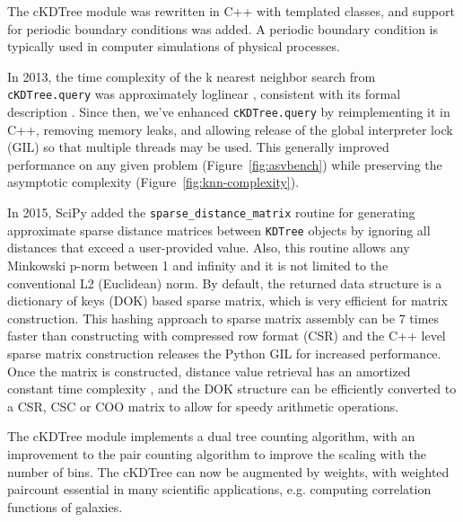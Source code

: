 The cKDTree module was rewritten in C++ with templated classes, and support for
periodic boundary conditions was added. A periodic boundary condition is typically 
used in computer simulations of physical processes.

In 2013, the time complexity of the k nearest neighbor search from
\texttt{cKDTree.query} was approximately loglinear \cite{knn-jake},
consistent with its formal description \cite{kdtree-search-algo}.
Since then, we've enhanced \texttt{cKDTree.query} by reimplementing it in
C++, removing memory leaks, and allowing release of the global interpreter lock (GIL) so that
multiple threads may be used\cite{gh-4374}. This generally improved
performance on any given problem (Figure~\ref{fig:asvbench}) while
preserving the asymptotic complexity (Figure~\ref{fig:knn-complexity}).

In 2015, SciPy added the \texttt{sparse\_distance\_matrix} routine for generating approximate 
sparse distance matrices between \texttt{KDTree} objects by ignoring all distances that 
exceed a user-provided value. Also, this routine allows any Minkowski p-norm between 1 and 
infinity and it is not limited to the conventional L2 (Euclidean) norm. 
By default, the returned data structure is a dictionary of keys (DOK) based sparse matrix, 
which is very efficient for matrix construction. 
This hashing approach to sparse matrix assembly can be 7 times faster than constructing 
with compressed row format (CSR) \cite{10.1007/978-3-540-75755-9_107} and the C++ level 
sparse matrix construction releases the Python GIL for increased performance. 
Once the matrix is constructed, distance value retrieval has an amortized constant time 
complexity \cite{Cormen:2001:IA:580470}, and the DOK structure can be efficiently converted 
to a CSR, CSC or COO matrix to allow for speedy arithmetic operations.

The cKDTree module implements a dual tree counting algorithm\cite{Moore2000ar},
with an improvement to the pair counting algorithm to improve the scaling
with the number of bins. The cKDTree can now be augmented by weights, with 
weighted paircount essential in many scientific applications, e.g. computing 
correlation functions of galaxies\cite{0004-637X-750-1-38}.
